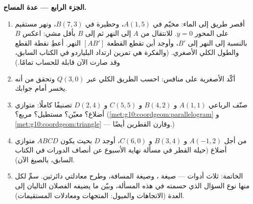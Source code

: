 \begin{problem}
\medskip
\noindent\textbf{الجزء الرابع --- عدة المساح.}
\begin{enumerate}[resume]
  \item أقصر طريق إلى الماء: مخيّم في $A(1, 5)$، وحظيرة
        في $B(7, 3)$، ونهر مستقيم على المحور $y = 0$.
        للانتقال من $A$ إلى النهر ثم إلى $B$ بأقل
        مشي: اعكس $B$ بالنسبة إلى النهر إلى $B'$،
        وأوجد أين تقطع القطعة $[AB']$ النهر.
        أعطِ نقطة القطع والطول الكلي الأصغري.
        (والفكرة هي تمرين ارتداد البلياردو في الكتاب السابق، وقد صارت الآن
        قابلة للحساب تمامًا.)
  \item أكّد الأصغرية على منافس: احسب الطريق الكلي
        عبر $Q(3, 0)$ وتحقق من أنه يخسر أمام جوابك.
  \item صنّف الرباعي $A(1,1)$ و $B(4,2)$ و
        $C(5,5)$ و $D(2,4)$ تصنيفًا كاملًا: متوازي أضلاع؟ معيّن؟
        مستطيل؟ مربع؟
        (\cref{met:g10:coordgeom:parallelogram} و
        \cref{met:g10:coordgeom:triangle} --- وقارن القطرين
        أيضًا.)
  \item من أجل $A(-1, 2)$ و $B(3, 4)$ و $C(6, 0)$، أوجد $D$ بحيث
        يكون $ABCD$ متوازي أضلاع (حيلة  القطر
        في مسألة نهاية الأسبوع عن أنصاف الدورات في الكتاب السابق، بالصيغ الآن).
  \item الخاتمة: ثلاث أدوات --- صيغة ، وصيغة
        المسافة، وطرح معادلتي دائرتين. سمِّ لكل منها
        نوع السؤال الذي حسمته في هذه المسألة، وبيّن
        ما يضيفه الفصلان التاليان إلى العدة
        (الاتجاهات والميول: المتجهات ومعادلات المستقيمات).
\end{enumerate}
\end{problem}
